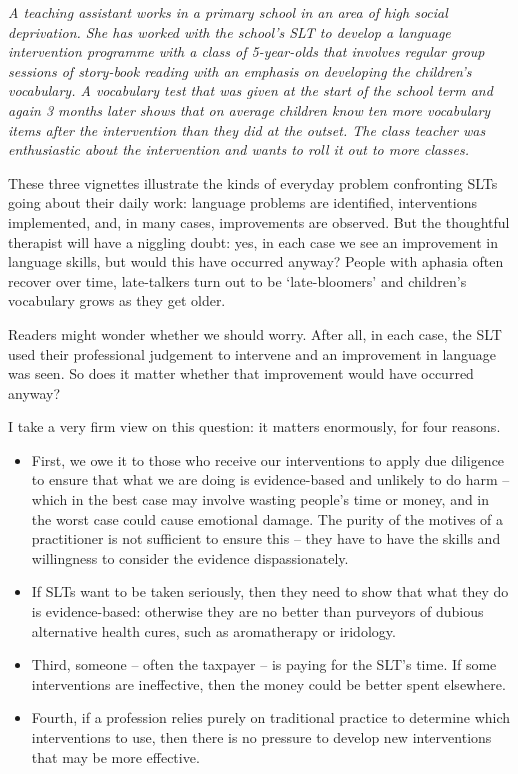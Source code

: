 \documentclass[]{book}
\providecommand{\tightlist}{%
  \setlength{\itemsep}{0pt}\setlength{\parskip}{0pt}}
\begin{document}
\emph{A teaching assistant works in a primary school in an area of high social deprivation. She has worked with the school's SLT to develop a language intervention programme with a class of 5-year-olds that involves regular group sessions of story-book reading with an emphasis on developing the children's vocabulary. A vocabulary test that was given at the start of the school term and again 3 months later shows that on average children know ten more vocabulary items after the intervention than they did at the outset. The class teacher was enthusiastic about the intervention and wants to roll it out to more classes.}

These three vignettes illustrate the kinds of everyday problem confronting SLTs going about their daily work: language problems are identified, interventions implemented, and, in many cases, improvements are observed. But the thoughtful therapist will have a niggling doubt: yes, in each case we see an improvement in language skills, but would this have occurred anyway? People with aphasia often recover over time, late-talkers turn out to be `late-bloomers' and children's vocabulary grows as they get older.

Readers might wonder whether we should worry. After all, in each case, the SLT used their professional judgement to intervene and an improvement in language was seen. So does it matter whether that improvement would have occurred anyway?

I take a very firm view on this question: it matters enormously, for four reasons.

\begin{itemize}
\tightlist
\item
  First, we owe it to those who receive our interventions to apply due diligence to ensure that what we are doing is evidence-based and unlikely to do harm -- which in the best case may involve wasting people's time or money, and in the worst case could cause emotional damage. The purity of the motives of a practitioner is not sufficient to ensure this -- they have to have the skills and willingness to consider the evidence dispassionately.
\item
  If SLTs want to be taken seriously, then they need to show that what they do is evidence-based: otherwise they are no better than purveyors of dubious alternative health cures, such as aromatherapy or iridology.
\item
  Third, someone -- often the taxpayer -- is paying for the SLT's time. If some interventions are ineffective, then the money could be better spent elsewhere.
\item
  Fourth, if a profession relies purely on traditional practice to determine which interventions to use, then there is no pressure to develop new interventions that may be more effective.
\end{itemize}
\end{document}

